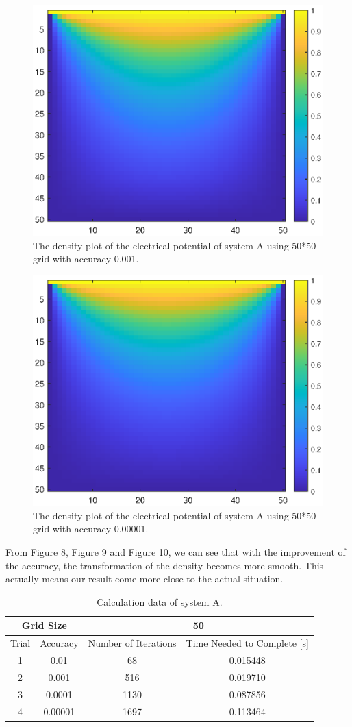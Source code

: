 \documentclass[12pt]{report}
\begin{document}
\begin{figure}[H]
    \centering
    \includegraphics[width=0.8\linewidth]{A0001Density.eps}
    \caption{The density plot of the electrical potential of system A using 50*50 grid with accuracy 0.001.}
\end{figure}
\begin{figure}[H]
    \centering
    \includegraphics[width=0.8\linewidth]{A000001Density.eps}
    \caption{The density plot of the electrical potential of system A using 50*50 grid with accuracy 0.00001.}
\end{figure}
From Figure 8, Figure 9 and Figure 10, we can see that with the improvement of the accuracy, the transformation of the density becomes more smooth. This actually means our result come more close to the actual situation.
\begin{table}[H]
    \centering
    \begin{tabular}{|c|c|c|c|}
        \hline
        \multicolumn{2}{|c|}{Grid Size}&\multicolumn{2}{c|}{50}\\
        \hline
         Trial&Accuracy&Number of Iterations&Time Needed to Complete [s]\\
         \hline
        1 & 0.01 & 68 & 0.015448 \\
        \hline
        2 &0.001& 516 &  0.019710  \\
        \hline
        3 & 0.0001 & 1130  &  0.087856 \\
        \hline
        4 & 0.00001 & 1697 & 0.113464 \\
        \hline
    \end{tabular}
    \caption{Calculation data of system A.}
\end{table}
\end{document}
